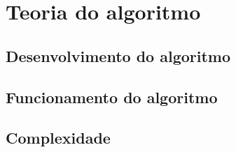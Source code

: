 \documentclass[
	12pt,				%
	openright,			%
	oneside,			%
	a4paper,			%
	english,			%
	french,				%
	spanish,			%
	brazil,				%
	]{abntex2}
\begin{document}
%
%
%
%
\chapter{Teoria do algoritmo}

\section{Desenvolvimento do algoritmo}

\section{Funcionamento do algoritmo}

\section{Complexidade}
\end{document}
